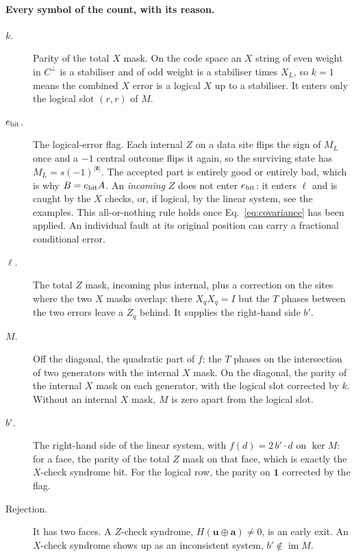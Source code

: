 \paragraph{Every symbol of the count, with its reason.}
\begin{description}
\item[$k$.] Parity of the total $X$ mask. On the code space an $X$ string of even weight in $C^\perp$ is a stabiliser and of odd weight is a stabiliser times $X_L$, so $k=1$ means the combined $X$ error is a logical $X$ up to a stabiliser. It enters only the logical slot $(r,r)$ of $M$.
\item[$e_{\rm bit}$.] The logical-error flag. Each internal $Z$ on a data site flips the sign of $M_L$ once and a $-1$ central outcome flips it again, so the surviving state has $M_L=s(-1)^{|\boldsymbol z|}$. The accepted part is entirely good or entirely bad, which is why $B=e_{\rm bit}A$. An \emph{incoming} $Z$ does not enter $e_{\rm bit}$: it enters $\ell$ and is caught by the $X$ checks, or, if logical, by the linear system, see the examples. This all-or-nothing rule holds once Eq.~\eqref{eq:covariance} has been applied. An individual fault at its original position can carry a fractional conditional error.
\item[$\ell$.] The total $Z$ mask, incoming plus internal, plus a correction on the sites where the two $X$ masks overlap: there $X_qX_q=I$ but the $T$ phases between the two errors leave a $Z_q$ behind. It supplies the right-hand side $b'$.
\item[$M$.] Off the diagonal, the quadratic part of $f$: the $T$ phases on the intersection of two generators with the internal $X$ mask. On the diagonal, the parity of the internal $X$ mask on each generator, with the logical slot corrected by $k$. Without an internal $X$ mask, $M$ is zero apart from the logical slot.
\item[$b'$.] The right-hand side of the linear system, with $f(d)=2\,b'\cdot d$ on $\ker M$: for a face, the parity of the total $Z$ mask on that face, which is exactly the $X$-check syndrome bit. For the logical row, the parity on $\boldsymbol1$ corrected by the flag.
\item[Rejection.] It has two faces. A $Z$-check syndrome, $H(\boldsymbol u\oplus\boldsymbol a)\ne0$, is an early exit. An $X$-check syndrome shows up as an inconsistent system, $b'\notin\operatorname{im}M$.
\end{description}


